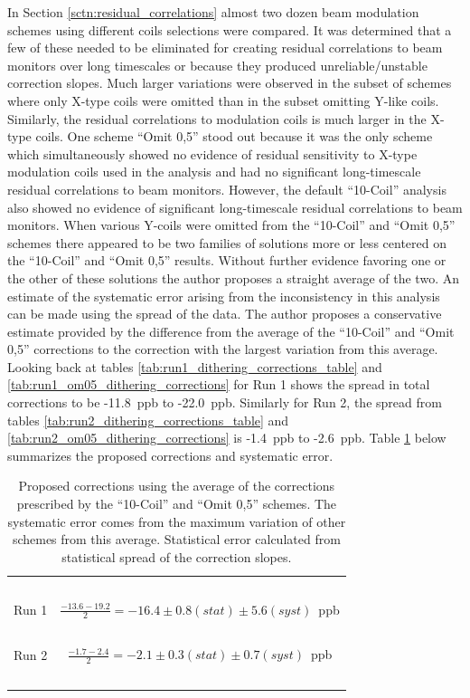 In Section \ref{sctn:residual_correlations} almost two dozen beam modulation schemes using different coils selections were compared. It was determined that a few of these needed to be eliminated for creating residual correlations to beam monitors over long timescales or because they produced unreliable/unstable correction slopes. Much larger variations were observed in the subset of schemes where only X-type coils were omitted than in the subset omitting Y-like coils. Similarly, the residual correlations to modulation coils is much larger in the X-type coils. One scheme ``Omit 0,5'' stood out because it was the only scheme which simultaneously showed no evidence of residual sensitivity to X-type modulation coils used in the analysis and had no significant long-timescale residual correlations to beam monitors. However, the default ``10-Coil'' analysis also showed no evidence of significant long-timescale residual correlations to beam monitors. When various Y-coils were omitted from the ``10-Coil'' and ``Omit 0,5'' schemes there appeared to be two families of solutions more or less centered on the ``10-Coil'' and ``Omit 0,5'' results. Without further evidence favoring one or the other of these solutions the author proposes a straight average of the two. An estimate of the systematic error arising from the inconsistency in this analysis can be made using the spread of the data. The author proposes a conservative estimate provided by the difference from the average of the ``10-Coil'' and ``Omit 0,5'' corrections to the correction with the largest variation from this average. Looking back at tables \ref{tab:run1_dithering_corrections_table} and \ref{tab:run1_om05_dithering_corrections} for Run 1 shows the spread in total corrections to be  -11.8~ppb to -22.0~ppb. Similarly for Run 2, the spread from tables \ref{tab:run2_dithering_corrections_table} and \ref{tab:run2_om05_dithering_corrections} is -1.4~ppb to -2.6~ppb. Table \ref{tab:total_corrections} below summarizes the proposed corrections and systematic error.

\begin{table}[ht]
\caption{\label{tab:total_corrections}Proposed corrections using the average of the corrections prescribed by the ``10-Coil'' and ``Omit 0,5'' schemes. The systematic error comes from the maximum variation of other schemes from this average. Statistical error calculated from statistical spread of the correction slopes.}
\begin{center}
\Large
\begin{tabular}{|l||c|}\hline
~&~\\
\large Run 1&$\frac{-13.6-19.2}{2}=-16.4\pm 0.8(stat)\pm 5.6(syst)$~ppb\\
~&~\\
\large Run 2&$\frac{-1.7-2.4}{2}=-2.1\pm 0.3(stat)\pm 0.7(syst)$~ppb\\~&~\\\hline
\end{tabular}
\end{center}
\end{table}

